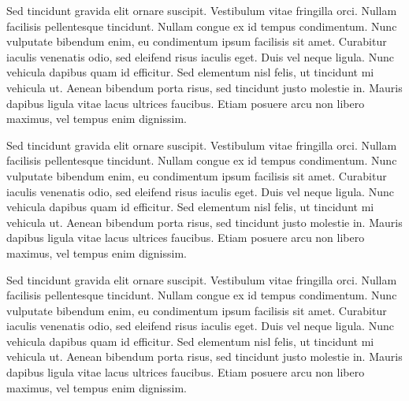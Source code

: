 Sed tincidunt gravida elit ornare suscipit. Vestibulum vitae fringilla orci. Nullam facilisis pellentesque tincidunt. Nullam congue ex id tempus condimentum. Nunc vulputate bibendum enim, eu condimentum ipsum facilisis sit amet. Curabitur iaculis venenatis odio, sed eleifend risus iaculis eget. Duis vel neque ligula. Nunc vehicula dapibus quam id efficitur. Sed elementum nisl felis, ut tincidunt mi vehicula ut. Aenean bibendum porta risus, sed tincidunt justo molestie in. Mauris dapibus ligula vitae lacus ultrices faucibus. Etiam posuere arcu non libero maximus, vel tempus enim dignissim. \par
Sed tincidunt gravida elit ornare suscipit. Vestibulum vitae fringilla orci. Nullam facilisis pellentesque tincidunt. Nullam congue ex id tempus condimentum. Nunc vulputate bibendum enim, eu condimentum ipsum facilisis sit amet. Curabitur iaculis venenatis odio, sed eleifend risus iaculis eget. Duis vel neque ligula. Nunc vehicula dapibus quam id efficitur. Sed elementum nisl felis, ut tincidunt mi vehicula ut. Aenean bibendum porta risus, sed tincidunt justo molestie in. Mauris dapibus ligula vitae lacus ultrices faucibus. Etiam posuere arcu non libero maximus, vel tempus enim dignissim. \par
Sed tincidunt gravida elit ornare suscipit. Vestibulum vitae fringilla orci. Nullam facilisis pellentesque tincidunt. Nullam congue ex id tempus condimentum. Nunc vulputate bibendum enim, eu condimentum ipsum facilisis sit amet. Curabitur iaculis venenatis odio, sed eleifend risus iaculis eget. Duis vel neque ligula. Nunc vehicula dapibus quam id efficitur. Sed elementum nisl felis, ut tincidunt mi vehicula ut. Aenean bibendum porta risus, sed tincidunt justo molestie in. Mauris dapibus ligula vitae lacus ultrices faucibus. Etiam posuere arcu non libero maximus, vel tempus enim dignissim. \par
